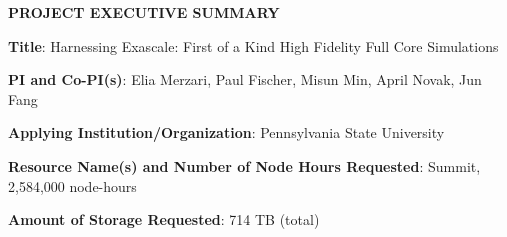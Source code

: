 \documentclass[11pt,letterpaper,english]{article}
\begin{document}
\setlength{\parindent}{0in} %

\pagestyle{fancy}   \renewcommand{%
\headrulewidth}{0.0pt}

\begin{center}
\bf {PROJECT EXECUTIVE SUMMARY} \\
\end{center}




\bigskip

\textbf{Title}: Harnessing Exascale: First of a Kind High Fidelity Full Core Simulations \smallskip

\textbf{PI and Co-PI(s)}: Elia Merzari, Paul Fischer, Misun Min, April Novak, Jun Fang \smallskip

\textbf{Applying Institution/Organization}: Pennsylvania State University \smallskip

\textbf{Resource Name(s) and Number of Node Hours Requested}: Summit, 2,584,000 node-hours \smallskip

\textbf{Amount of Storage Requested}: 714 TB (total) \smallskip
\end{document}
